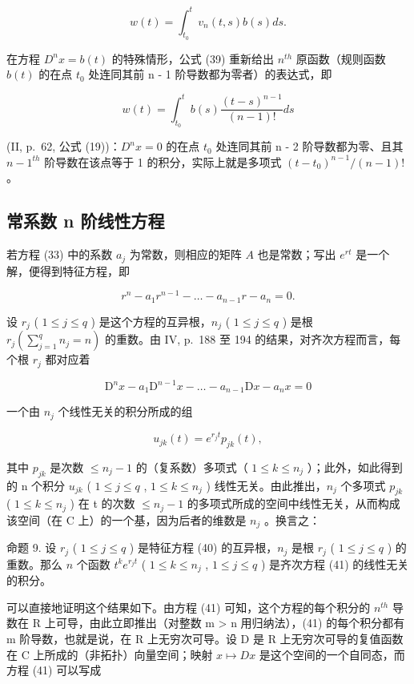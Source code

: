 \[
w (t) = \int_ {t _ {0}} ^ {t} v _ {n} (t, s) b (s) d s.\tag{39}
\]

在方程 \(D^{n}x = b(t)\) 的特殊情形，公式 (39) 重新给出 \(n^{th}\) 原函数（规则函数 \(b(t)\) 的在点 \(t_{0}\) 处连同其前 n - 1 阶导数都为零者）的表达式，即

\[
w (t) = \int_ {t _ {0}} ^ {t} b (s) \frac {(t - s) ^ {n - 1}}{(n - 1) !} d s
\]

(II, p.~62, 公式 (19))：\(D^{n}x = 0\) 的在点 \(t_{0}\) 处连同其前 n - 2 阶导数都为零、且其 \(n - 1^{th}\) 阶导数在该点等于 1 的积分，实际上就是多项式 \((t - t_{0})^{n-1}/(n - 1)!\) 。

\subsection{常系数 n 阶线性方程}

若方程 (33) 中的系数 \(a_{j}\) 为常数，则相应的矩阵 \(A\) 也是常数；写出 \(e^{rt}\) 是一个解，便得到特征方程，即

\[
r ^ {n} - a _ {1} r ^ {n - 1} - \ldots - a _ {n - 1} r - a _ {n} = 0.\tag{40}
\]

设 \(r_j\) ( \(1 \leqslant j \leqslant q\) ) 是这个方程的互异根，\(n_j\) ( \(1 \leqslant j \leqslant q\) ) 是根 \(r_j \left( \sum_{j=1}^{q} n_j = n \right)\) 的重数。由 IV, p.~188 至 194 的结果，对齐次方程而言，每个根 \(r_j\) 都对应着

\[
\mathrm{D} ^ {n} x - a _ {1} \mathrm{D} ^ {n - 1} x - \dots - a _ {n - 1} \mathrm{D} x - a _ {n} x = 0\tag{41}
\]

一个由 \(n_j\) 个线性无关的积分所成的组

\[
u _ {j k} (t) = e ^ {r _ {j} t} p _ {j k} (t),
\]

其中 \(p_{jk}\) 是次数 \(\leqslant n_{j}-1\) 的（复系数）多项式（ \(1\leqslant k\leqslant n_{j}\) ）；此外，如此得到的 n 个积分 \(u_{jk}\) ( \(1\leqslant j\leqslant q\) , \(1\leqslant k\leqslant n_{j}\) ) 线性无关。由此推出，\(n_{j}\) 个多项式 \(p_{jk}\) ( \(1\leqslant k\leqslant n_{j}\) ) 在 t 的次数 \(\leqslant n_{j}-1\) 的多项式所成的空间中线性无关，从而构成该空间（在 C 上）的一个基，因为后者的维数是 \(n_{j}\) 。换言之：

命题 9. 设 \(r_j\) ( \(1 \leqslant j \leqslant q\) ) 是特征方程 (40) 的互异根，\(n_j\) 是根 \(r_j\) ( \(1 \leqslant j \leqslant q\) ) 的重数。那么 \(n\) 个函数 \(t^k e^{r_j t}\) ( \(1 \leqslant k \leqslant n_j\) , \(1 \leqslant j \leqslant q\) ) 是齐次方程 (41) 的线性无关的积分。

可以直接地证明这个结果如下。由方程 (41) 可知，这个方程的每个积分的 \(n^{th}\) 导数在 R 上可导，由此立即推出（对整数 m \textgreater{} n 用归纳法），(41) 的每个积分都有 m 阶导数，也就是说，在 R 上无穷次可导。设 D 是 R 上无穷次可导的复值函数在 C 上所成的（非拓扑）向量空间；映射 \(x \mapsto Dx\) 是这个空间的一个自同态，而方程 (41) 可以写成

